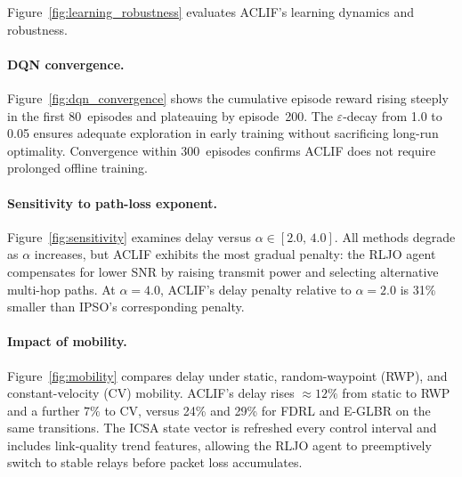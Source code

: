 \documentclass[a4paper]{cas-dc}
\numberwithin{equation}{section}
\begin{document}
Figure~\ref{fig:learning_robustness} evaluates ACLIF's learning dynamics and
robustness.

\paragraph{DQN convergence.}
Figure~\ref{fig:dqn_convergence} shows the cumulative episode reward rising
steeply in the first 80~episodes and plateauing by episode~200. The
$\varepsilon$-decay from 1.0 to 0.05 ensures adequate exploration in early
training without sacrificing long-run optimality. Convergence within
300~episodes confirms ACLIF does not require prolonged offline training.

\paragraph{Sensitivity to path-loss exponent.}
Figure~\ref{fig:sensitivity} examines delay versus $\alpha \in [2.0,\,4.0]$.
All methods degrade as $\alpha$ increases, but ACLIF exhibits the most
gradual penalty: the RLJO agent compensates for lower SNR by raising transmit
power and selecting alternative multi-hop paths. At $\alpha{=}4.0$, ACLIF's
delay penalty relative to $\alpha{=}2.0$ is 31\% smaller than IPSO's
corresponding penalty.

\paragraph{Impact of mobility.}
Figure~\ref{fig:mobility} compares delay under static, random-waypoint (RWP),
and constant-velocity (CV) mobility. ACLIF's delay rises ${\approx}12\%$
from static to RWP and a further $7\%$ to CV, versus 24\% and 29\% for FDRL
and E-GLBR on the same transitions. The ICSA state vector is refreshed every
control interval and includes link-quality trend features, allowing the RLJO
agent to preemptively switch to stable relays before packet loss accumulates.

\FloatBarrier  %
\end{document}
